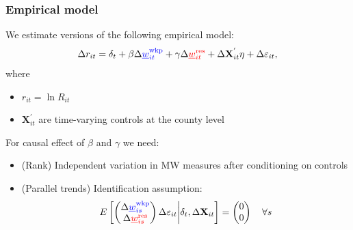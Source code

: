 \documentclass[aspectratio=169, t]{beamer}
\newcommand{\mw}{\underline{w}}
\newcommand{\wkp}{\text{wkp}}
\newcommand{\res}{\text{res}}
\begin{document}
\begin{frame}
    \frametitle{Empirical model}
        
    We estimate versions of the following empirical model:
    $$
    \Delta r_{it} = \delta_t +
        \beta \Delta {\color{blue}\mw^{\wkp}_{it}} +
        \gamma \Delta {\color{red}\mw^{\res}_{it}} + 
        \Delta \mathbf{X}^{'}_{it} \eta + 
        \Delta \varepsilon_{it} ,
    $$    
    where
    \begin{itemize}
        \item $r_{it} = \ln R_{it}$
        \item $\mathbf{X}^{'}_{it}$ are time-varying controls at the county level
    \end{itemize}
    
    \pause
    \vspace{4mm}
    For causal effect of $\beta$ and $\gamma$ we need:
    \begin{itemize}
        \item (Rank) Independent variation in MW measures after conditioning on controls
        \item (Parallel trends) Identification assumption:
        $$
        E\left[
            \begin{pmatrix}
                \Delta {\color{blue}\mw^{\wkp}_{is}} \\
                \Delta {\color{red}\mw^{\res}_{is}} \\
            \end{pmatrix}
            \Delta \varepsilon_{it}
        \bigg| \delta_t, \Delta \mathbf{X}_{it} \right] =
        \begin{pmatrix}
            0 \\
            0 \\
        \end{pmatrix}
        \quad \forall s
        $$
    \end{itemize}

\end{frame}
\end{document}
